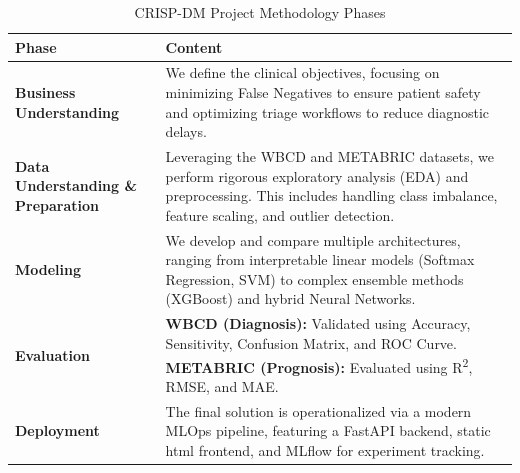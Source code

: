 \begin{table}[h]
    \centering
    \caption{CRISP-DM Project Methodology Phases}
    \renewcommand{\arraystretch}{1.5}
    \begin{tabular}{|p{}|p{}|}
        \hline
        \textbf{Phase} & \textbf{Content} \\
        \hline
        \textbf{Business Understanding} & We define the clinical objectives, focusing on minimizing False Negatives to ensure patient safety and optimizing triage workflows to reduce diagnostic delays. \\
        \hline
        \textbf{Data Understanding \& Preparation} & Leveraging the WBCD and METABRIC datasets, we perform rigorous exploratory analysis (EDA) and preprocessing. This includes handling class imbalance, feature scaling, and outlier detection. \\
        \hline
        \textbf{Modeling} & We develop and compare multiple architectures, ranging from interpretable linear models (Softmax Regression, SVM) to complex ensemble methods (XGBoost) and hybrid Neural Networks. \\
        \hline
        \textbf{Evaluation} & \textbf{WBCD (Diagnosis):} Validated using Accuracy, Sensitivity, Confusion Matrix, and ROC Curve. \newline \textbf{METABRIC (Prognosis):} Evaluated using R\textsuperscript{2}, RMSE, and MAE. \\
        \hline
        \textbf{Deployment} & The final solution is operationalized via a modern MLOps pipeline, featuring a FastAPI backend, static html frontend, and MLflow for experiment tracking. \\
        \hline
    \end{tabular}
\end{table}
